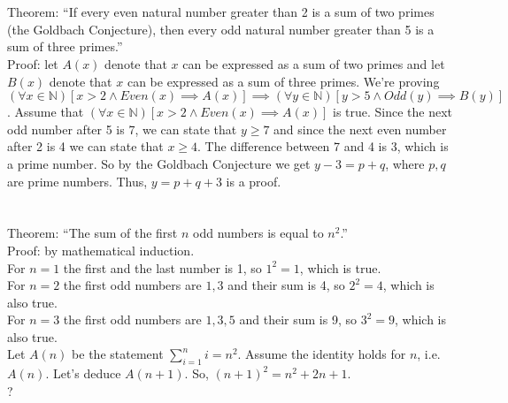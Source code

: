\documentclass{article}
\begin{document}
\section{}

Theorem: ``If every even natural number greater than 2 is a sum of two primes
(the Goldbach Conjecture), then every odd natural number greater than 5 is a sum
of three primes.''
\\
Proof: let $A(x)$ denote that $x$ can be expressed as a sum of two primes and
let $B(x)$ denote that $x$ can be expressed as a sum of three primes. We're
proving $(\forall x \in \mathbb{N})[x > 2 \wedge Even(x) \implies A(x)] \implies
(\forall y \in \mathbb{N})[y > 5 \wedge Odd(y) \implies B(y)]$.  Assume that
$(\forall x \in \mathbb{N})[x > 2 \wedge Even(x) \implies A(x)]$ is true. Since
the next odd number after 5 is 7, we can state that $y \geq 7$ and since the
next even number after 2 is 4 we can state that $x \geq 4$. The difference between
7 and 4 is 3, which is a prime number. So by the Goldbach Conjecture we get
$y - 3 = p + q$, where $p, q$ are prime numbers. Thus, $y = p + q + 3$ is a proof.

\section{}

Theorem: ``The sum of the first $n$ odd numbers is equal to $n^2$.''
\\
Proof: by mathematical induction.
\\
For $n = 1$ the first and the last number is 1, so $1^2 = 1$, which is true.
\\
For $n = 2$ the first odd numbers are $1, 3$ and their sum is 4, so $2^2 = 4$,
which is also true.
\\
For $n = 3$ the first odd numbers are $1, 3, 5$ and their sum is 9, so $3^2 =
9$, which is also true.
\\
Let $A(n)$ be the statement $\sum\limits_{i=1}^n i = n^2$. Assume the identity
holds for $n$, i.e. $A(n)$. Let's deduce $A(n + 1)$. So, $(n + 1)^2 = n^2 + 2n +
1$.
\\
?
\end{document}
